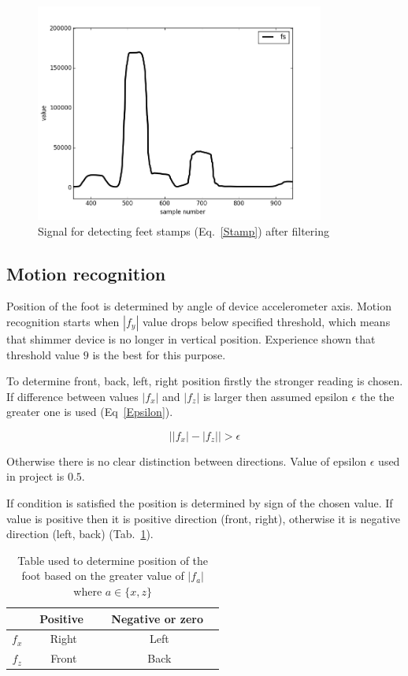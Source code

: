 \documentclass[conference]{IEEEtran}
\begin{document}
\begin{figure}[!h]
    \centering
    \includegraphics[width=9.5cm]{Images/StampFiltered.png}
    \caption{Signal for detecting feet stamps (Eq.~\ref{Stamp}) after filtering}
    \label{fig:StampFiltered}
\end{figure}

\subsection{Motion recognition}

Position of the foot is determined by angle of device accelerometer axis.
Motion recognition starts when $|f_y|$ value drops below specified threshold, which means that shimmer device is no longer in vertical position. Experience shown that threshold value $9$ is the best for this purpose.

To determine front, back, left, right position firstly the stronger reading is chosen.
If difference between values $|f_x|$ and $|f_z|$ is larger then assumed epsilon $\epsilon$ the the greater one is used (Eq~\ref{Epsilon}).

\begin{equation}
    \left||f_x| - |f_z|\right| > \epsilon
    \label{Epsilon}
\end{equation}

Otherwise there is no clear distinction between directions. Value of epsilon $\epsilon$ used in project is $0.5$.

If condition is satisfied the position is determined by sign of the chosen value.
If value is positive then it is positive direction (front, right), otherwise it is negative direction (left, back) (Tab.~\ref{Directions}).

\begin{table}[h!]
	\caption{Table used to determine position of the foot based on the greater value of $|f_a|$ where $a \in \{x, z\}$}
	\begin{center}
		\begin{tabular}{c|cc}
			& \ Positive \ &\ Negative or zero \ \\
			\hline
			$f_x$&Right&Left\\
			$f_z$&Front&Back\\
		\end{tabular}
		\label{Directions}
	\end{center}
\end{table}
\end{document}
